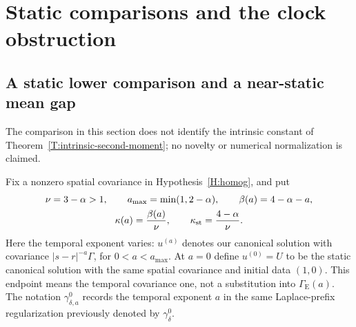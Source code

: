 \documentclass[12pt,oneside,openany]{book}
\numberwithin{equation}{section}
\theoremstyle{nogostyle}
\theoremstyle{definition}
\begin{document}
\chapter{Static comparisons and the clock obstruction}\label{S:appendix-static-clock}



\section{A static lower comparison and a near-static mean gap}
\label{S:near-static-lower}

The comparison in this section does not identify the intrinsic constant of
Theorem~\ref{T:intrinsic-second-moment}; no novelty or numerical normalization
is claimed.

Fix a nonzero spatial covariance in Hypothesis~\ref{H:homog}, and put
\[
  \begin{gathered}
    \nu=3-\alpha>1,\qquad a_{\max}=\min(1,2-\alpha),\qquad
    \beta(a)=4-\alpha-a,\\
    \kappa(a)=\frac{\beta(a)}\nu,\qquad
    \kappa_{\rm st}=\frac{4-\alpha}\nu.
  \end{gathered}
\]
Here the temporal exponent varies: $u^{(a)}$ denotes our canonical solution with
covariance $|s-r|^{-a}\Gamma$, for $0 < a < a_{\max}$. At $a = 0$ define
$u^{(0)} = U$ to be the static canonical solution with the same spatial
covariance and initial data $(1,0)$. This endpoint means the temporal covariance
one, not a substitution into $\Gamma_{\mathrm{E}}(a)$. The notation
$\gamma_{\delta,a}^0$ records the temporal exponent $a$ in the same
Laplace-prefix regularization previously denoted by $\gamma_\delta^0$.
\end{document}
